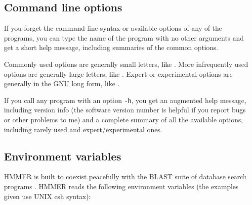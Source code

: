 \subsection{Command line options}

If you forget the command-line syntax or available options of any of
the programs, you can type the name of the program with no other
arguments and get a short help message, including summaries of the
common options.

Commonly used options are generally small letters, like .
More infrequently used options are generally large letters, like
. Expert or experimental options are generally in the GNU long form,
like .

If you call any program with an option {\tt -h}, you get an augmented
help message, including version info (the software version number is
helpful if you report bugs or other problems to me) and a complete
summary of all the available options, including rarely used and
expert/experimental ones.

\subsection{Environment variables}

HMMER is built to coexist peacefully with the BLAST suite of database
search programs \cite{Altschul91}. HMMER reads the following
environment variables (the examples given use UNIX csh syntax):

